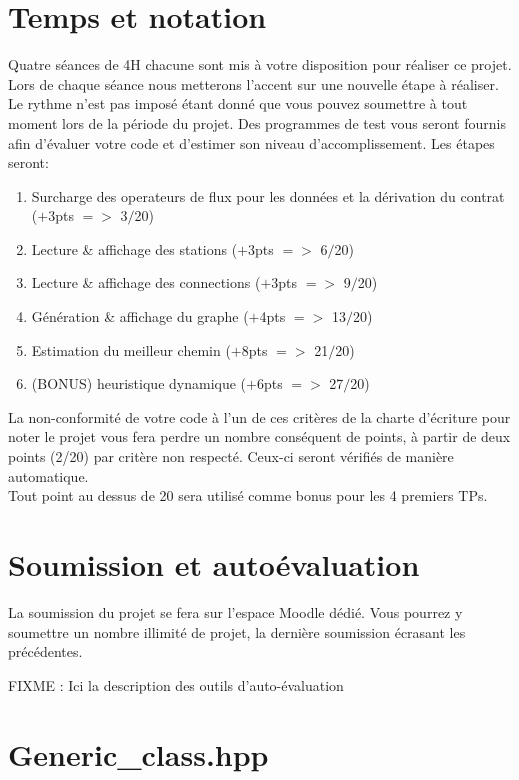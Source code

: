 \documentclass[9pts]{article}
\begin{document}
\pagebreak

\section{Temps et notation}

Quatre séances de 4H chacune sont mis à votre disposition pour réaliser ce projet.
Lors de chaque séance nous metterons l'accent sur une nouvelle étape à réaliser. Le rythme n'est pas imposé étant donné que vous pouvez soumettre à tout moment lors de la période du projet.
Des programmes de test vous seront fournis afin d'évaluer votre code et d'estimer son niveau d'accomplissement.
Les étapes seront:
\begin{enumerate}
\item Surcharge des operateurs de flux pour les données et la dérivation du contrat ($+$3pts $=>$ 3$/$20)
\item Lecture \& affichage des stations ($+$3pts $=>$ 6$/$20)
\item Lecture \& affichage des connections ($+$3pts $=>$ 9$/$20)
\item Génération \& affichage du graphe ($+$4pts $=>$ 13$/$20)
\item Estimation du meilleur chemin ($+$8pts $=>$ 21$/$20)
\item (BONUS) heuristique dynamique ($+$6pts $=>$ 27$/$20)
\end{enumerate}

La non-conformité de votre code à l'un de ces critères de la charte d'écriture pour noter le projet vous fera perdre un nombre conséquent de points, à partir de deux points (2/20) par critère non respecté. Ceux-ci seront vérifiés de manière automatique.\\

Tout point au dessus de 20 sera utilisé comme bonus pour les 4 premiers TPs. \\

\section{Soumission et autoévaluation}

La soumission du projet se fera sur l'espace Moodle dédié. Vous pourrez y soumettre un nombre illimité de projet, la dernière soumission écrasant les précédentes.

FIXME : Ici la description des outils d'auto-évaluation

\appendix
\clearpage
\section{Generic\_class.hpp}

\end{document}
